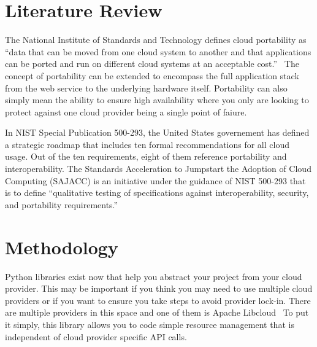 \section{Literature Review}

The National Institute of Standards and Technology defines cloud  portability as ``data 
that can be moved from one cloud system to another and that  applications can be ported 
and run on different  cloud systems at an  acceptable cost.''~\cite{hid-sp18-518-NIST-291} 
The concept of portability can be extended to encompass the full application stack from
the web service to the underlying hardware itself. Portability can also simply mean the 
ability to ensure high availability where you only are looking to protect against one 
cloud provider being a single point of faiure.

In NIST Special Publication 500-293, the United States governement has defined a strategic
roadmap that includes ten formal recommendations for all cloud usage. Out of the ten 
requirements, eight of them reference portability and interoperability. The Standards 
Acceleration to Jumpstart the Adoption of Cloud Computing (SAJACC) is an initiative under
the guidance of NIST 500-293 that is to define ``qualitative testing of specifications 
against interoperability, security, and portability requirements.''~\cite{hid-sp18-518-NIS
T-293}

\section{Methodology}

Python libraries exist now that help you abstract your project from  your cloud provider. 
This may be important if you think you may need to use multiple cloud providers or if you 
want to ensure you take steps to avoid provider lock-in. There are multiple providers in 
this space and one of them is Apache Libcloud~\cite{hid-sp18-518-LibCloud} To put it 
simply, this library allows you to code simple resource  management that is independent 
of cloud provider specific API calls.

